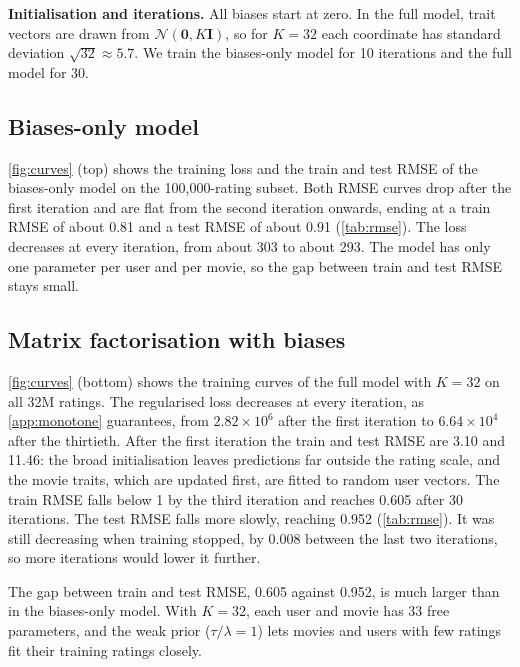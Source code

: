 \documentclass{article}
\theoremstyle{plain}
\theoremstyle{definition}
\theoremstyle{remark}
\begin{document}
\textbf{Initialisation and iterations.}
All biases start at zero. In the full model, trait vectors are drawn from
$\mathcal{N}(\mathbf{0}, K\mathbf{I})$, so for $K = 32$ each coordinate has
standard deviation $\sqrt{32} \approx 5.7$. We train the biases-only model
for 10 iterations and the full model for 30.

\subsection{Biases-only model}
\label{sec:res-bias}

\cref{fig:curves} (top) shows the training loss and the train and test RMSE
of the biases-only model on the 100{,}000-rating subset. Both RMSE curves
drop after the first iteration and are flat from the second iteration
onwards, ending at a train RMSE of about 0.81 and a test RMSE of about
0.91 (\cref{tab:rmse}). The loss decreases at every iteration, from about
303 to about 293. The model has only one parameter per user and per movie,
so the gap between train and test RMSE stays small.



\subsection{Matrix factorisation with biases}
\label{sec:res-mf}



\cref{fig:curves} (bottom) shows the training curves of the full model with
$K = 32$ on all 32M ratings. The regularised loss decreases at every
iteration, as \cref{app:monotone} guarantees, from $2.82 \times 10^{6}$
after the first iteration to $6.64 \times 10^{4}$ after the thirtieth.
After the first iteration the train and test RMSE are 3.10 and 11.46:
the broad initialisation leaves predictions far outside the rating scale,
and the movie traits, which are updated first, are fitted to random user
vectors. The train RMSE falls below 1 by the third iteration and reaches
0.605 after 30 iterations. The test RMSE falls more slowly, reaching 0.952
(\cref{tab:rmse}). It was still decreasing when training stopped, by 0.008
between the last two iterations, so more iterations would lower it
further.

The gap between train and test RMSE, 0.605 against 0.952, is much larger
than in the biases-only model. With $K = 32$, each user and movie has 33
free parameters, and the weak prior ($\tau/\lambda = 1$) lets movies and
users with few ratings fit their training ratings closely.
\end{document}

